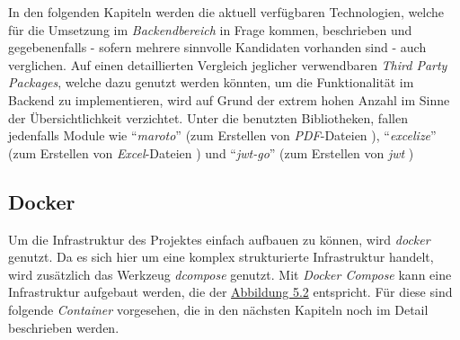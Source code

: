 	\newpage
	In den folgenden Kapiteln werden die aktuell verfügbaren Technologien, welche für die Umsetzung im \textit{Backendbereich} in Frage kommen, beschrieben und gegebenenfalls - sofern mehrere sinnvolle Kandidaten vorhanden sind - auch verglichen. Auf einen detaillierten Vergleich jeglicher verwendbaren \textit{Third Party Packages}, welche dazu genutzt werden könnten, um die Funktionalität im Backend zu implementieren, wird auf Grund der extrem hohen Anzahl im Sinne der Übersichtlichkeit verzichtet. Unter die benutzten Bibliotheken, fallen jedenfalls Module wie \enquote{\textit{maroto}} (zum Erstellen von \textit{PDF}-Dateien \cite{maroto}), \enquote{\textit{excelize}} (zum Erstellen von \textit{Excel}-Dateien \cite{excelize}) und \enquote{\textit{jwt-go}} (zum Erstellen von \textit{\Gls{jwt}} \cite{jwt-go}) 
	\subsection{Docker}
	Um die Infrastruktur des Projektes einfach aufbauen zu können, wird \textit{\Gls{docker}} genutzt. Da es sich hier um eine komplex strukturierte Infrastruktur handelt, wird zusätzlich das Werkzeug \textit{\Gls{dcompose}} genutzt. Mit \textit{Docker Compose} kann eine Infrastruktur aufgebaut werden, die der \hyperref[fig:uebersicht]{Abbildung 5.2} entspricht. Für diese sind folgende \textit{Container} vorgesehen, die in den nächsten Kapiteln noch im Detail beschrieben werden.
